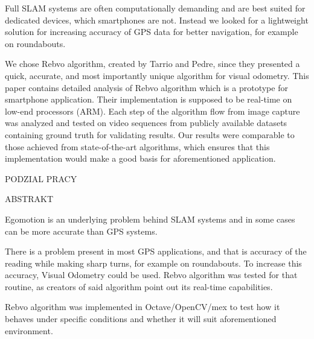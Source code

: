 \cite{pineco}
\cite{androidvr} 

Full SLAM systems are often computationally demanding and are best suited for dedicated devices, which smartphones are not. Instead we looked for a lightweight solution for increasing accuracy of GPS data for better navigation, for example on roundabouts.

We chose Rebvo algorithm, created by Tarrio and Pedre, since they presented a quick, accurate, and most importantly unique algorithm for visual odometry. This paper contains detailed analysis of Rebvo algorithm which is a prototype for smartphone application. Their implementation is supposed to be real-time on low-end processors (ARM).
Each step of the algorithm flow from image capture was analyzed and tested on video sequences from publicly available datasets containing ground truth for validating results. Our results were comparable to those achieved from state-of-the-art algorithms, which ensures that this implementation would make a good basis for aforementioned application.

PODZIAL PRACY

ABSTRAKT

Egomotion is an underlying problem behind SLAM systems and in some cases can be more accurate than GPS systems.

There is a problem present in most GPS applications, and that is accuracy of the reading while making sharp turns, for example on roundabouts. To increase this accuracy, Visual Odometry could be used. Rebvo algorithm was tested for that routine, as creators of said algorithm point out its real-time capabilities.

Rebvo algorithm was implemented in Octave/OpenCV/mex to test how it behaves under specific conditions and whether it will suit aforementioned environment.

